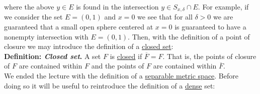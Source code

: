 \documentclass[12pt]{article}
\newlength\tindent
\renewcommand{\indent}{\hspace*{\tindent}}
\begin{document}
where the above $y \in E$ is found in the intersection $y \in S_{x,\delta} \cap E$. For example, if we consider the set $E = (0, 1)$ and $x = 0$ we see that for all $\delta > 0$ we are guaranteed that a small open sphere centered at $x = 0$ is guaranteed to have a nonempty intersection with $E = (0, 1)$. Then, with the definition of a point of closure we may introduce the definition of a \underline{closed set}: \\

%
%
{\bf Definition: {\em Closed set}.} A set $F$ is \underline{closed} if $\overline{F} = F$. That is, the points of closure of $F$ are contained within $F$ and the points of $F$ are contained within $\overline{F}$. \\

\indent We ended the lecture with the definition of a \underline{separable metric space}. Before doing so it will be useful to reintroduce the definition of a \underline{dense} set: \\
\end{document}
